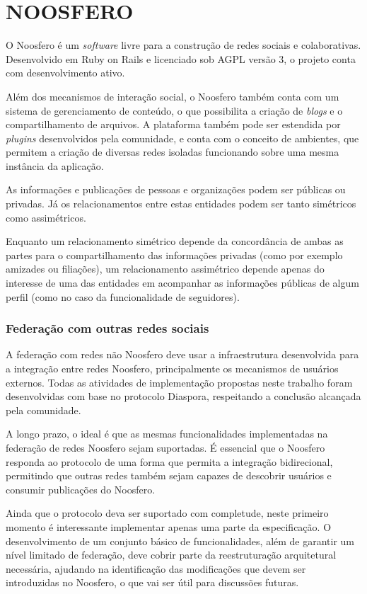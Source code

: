 \chapter{NOOSFERO}
\label{chapter:3}

O Noosfero é um \textit{software} livre para a construção de redes sociais e
colaborativas. Desenvolvido em Ruby on Rails e licenciado sob AGPL versão 3, o
projeto conta com desenvolvimento ativo.

Além dos mecanismos de interação social, o Noosfero também conta com um sistema de
gerenciamento de conteúdo, o que possibilita a criação de \textit{blogs} e o
compartilhamento de arquivos. A plataforma também pode ser estendida por
\textit{plugins} desenvolvidos pela comunidade, e conta com o conceito de ambientes,
que permitem a criação de diversas redes isoladas funcionando sobre uma mesma
instância da aplicação.

As informações e publicações de pessoas e organizações podem ser públicas ou
privadas. Já os relacionamentos entre estas entidades podem ser tanto simétricos
como assimétricos.

Enquanto um relacionamento simétrico depende da concordância de ambas as partes para
o compartilhamento das informações privadas (como por exemplo amizades ou
filiações), um relacionamento assimétrico depende apenas do interesse de uma das
entidades em acompanhar as informações públicas de algum perfil (como no caso da
funcionalidade de seguidores).


\subsection{Federação com outras redes sociais}
\label{subsec:federacao_externa}

A federação com redes não Noosfero deve usar a infraestrutura desenvolvida para a
integração entre redes Noosfero, principalmente os mecanismos de usuários externos.
Todas as atividades de implementação propostas neste trabalho foram desenvolvidas
com base no protocolo Diaspora, respeitando a conclusão alcançada pela comunidade.

A longo prazo, o ideal é que as mesmas funcionalidades implementadas na federação de
redes Noosfero sejam suportadas. É essencial que o Noosfero responda ao protocolo de
uma forma que permita a integração bidirecional, permitindo que outras redes
também sejam capazes de descobrir usuários e consumir publicações do Noosfero.

Ainda que o protocolo deva ser suportado com completude, neste primeiro momento é
interessante implementar apenas uma parte da especificação. O desenvolvimento de um
conjunto básico de funcionalidades, além de garantir um nível limitado de federação,
deve cobrir parte da reestruturação arquitetural necessária, ajudando na
identificação das modificações que devem ser introduzidas no Noosfero, o que vai ser
útil para discussões futuras.

